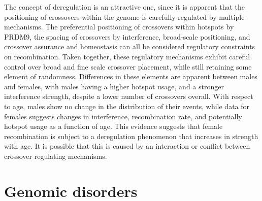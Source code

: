 
The concept of deregulation is an attractive one, since it is apparent that the positioning of crossovers within the genome is carefully regulated by multiple mechanisms.
The preferential positioning of crossovers within hotspots by PRDM9, the spacing of crossovers by interference, broad-scale positioning, and crossover assurance and homeostasis can all be considered regulatory constraints on recombination.
Taken together, these regulatory mechanisms exhibit careful control over broad and fine scale crossover placement, while still retaining some element of randomness.
Differences in these elements are apparent between males and females, with males having a higher hotspot usage, and a stronger interference strength, despite a lower number of crossovers overall.
With respect to age, males show no change in the distribution of their events, while data for females suggests changes in interference, recombination rate, and potentially hotspot usage as a function of age.
This evidence suggests that female recombination is subject to a deregulation phenomenon that increases in strength with age. %
It is possible that this is caused by an interaction or conflict between crossover regulating mechanisms.


% 


\section{Genomic disorders}

% 

